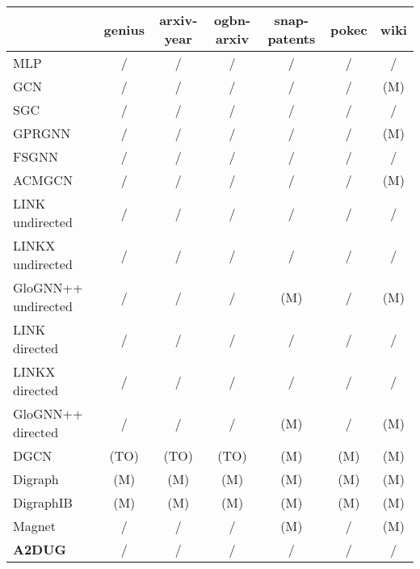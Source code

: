 \begin{table*}[t]
{\begin{tabular}{l|ccc|ccc}
{}&genius&arxiv-year&ogbn-arxiv&snap-patents&pokec&wiki\\
\midrule
MLP &  /  &  /  & /  & /  &  /  & /  \\\midrule
GCN & /  & /  & /  &  /  &  /  &(M) \\
SGC &  /  & /  & /  &  /  &  /  &  /  \\
GPRGNN&  /  & /  & /  & /  &  /  &(M) \\
FSGNN & /  & /  & /  &  /  &  /  & /  \\
ACMGCN&  /  & /  & /  &  /  &  /  &(M) \\\midrule
LINK undirected &  /  &  /  & /  &  /  & /  & /  \\
LINKX undirected& /  &  /  & /  &  /  & /  & /  \\
GloGNN++ undirected & /  &  /  &  /  &(M) & /  &(M) \\ \midrule
LINK directed &  /  &  /  & /  &  /  & /  & /  \\
LINKX directed& /  &  /  & /  &  /  & /  & /  \\
GloGNN++ directed & /  &  /  & /  & (M) &  /  &(M) \\ \midrule
DGCN& (TO) & (TO) &(TO) &(M) & (M) &(M)\\
Digraph & (M) & (M) &(M) & (M) & (M) &(M)\\
DigraphIB & (M) & (M) &(M) & (M) & (M) &(M)\\
Magnet& /  & /  & /  &(M) & /  &(M) \\\midrule
\textbf{A2DUG} & /  & /  & /  & /  &  /  & /  \\

\bottomrule
\end{tabular}
}
\label{tb:efficiency}
\end{table*} 
